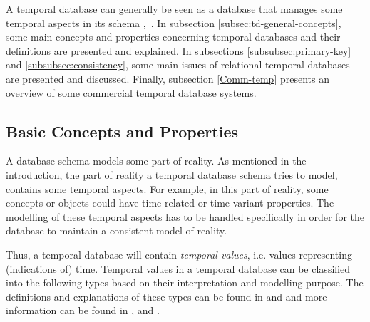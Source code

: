 %
%
A temporal database can generally be seen as a database that manages some temporal aspects in its schema \cite{etzion1998},~\cite{Billiet:Pons:Matthe:DeTre:Pons:2011:BipolarFuzzy}. In subsection \ref{subsec:td-general-concepts}, some main concepts and properties concerning temporal databases and their definitions are presented and explained. In subsections \ref{subsubsec:primary-key} and \ref{subsubsec:consistency}, some main issues of relational temporal databases are presented and discussed. Finally, subsection \ref{Comm-temp} presents an overview of some commercial temporal database systems.

\subsection{\label{subsec:td-general-concepts}Basic Concepts and Properties}
A database schema models some part of reality. As mentioned in the introduction, the part of reality a temporal database schema tries to model, contains some temporal aspects. For example, in this part of reality, some concepts or objects could have time-related or time-variant properties. The modelling of these temporal aspects has to be handled specifically in order for the database to maintain a consistent model of reality.

Thus, a temporal database will contain \emph{temporal values}, i.e. values representing (indications of) time. Temporal values in a temporal database can be classified into the following types based on their interpretation and modelling purpose. The definitions and explanations of these types can be found in \cite{Dyreson1994} and \cite{Nascimento95decisiontime} and more information can be found in \cite{Jensen:1991:IIM:627283.627484}, \cite{Snodgrass:1984:TQL:588011.588041} and \cite{Nascimento95decisiontime}.


